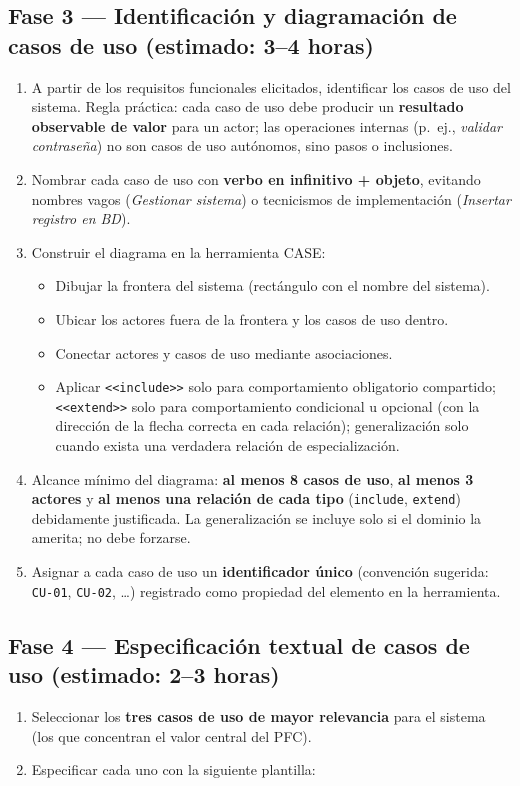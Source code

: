 \documentclass[11pt]{article}
\begin{document}
\subsection*{\textcolor{midblue}{Fase 3 --- Identificación y diagramación de casos de uso (estimado: 3--4 horas)}}
\begin{enumerate}[leftmargin=18pt,itemsep=2pt]
  \item A partir de los requisitos funcionales elicitados, identificar los casos de uso del sistema. Regla práctica: cada caso de uso debe producir un \textbf{resultado observable de valor} para un actor; las operaciones internas (p.~ej., \textit{validar contraseña}) no son casos de uso autónomos, sino pasos o inclusiones.
  \item Nombrar cada caso de uso con \textbf{verbo en infinitivo + objeto}, evitando nombres vagos (\textit{Gestionar sistema}) o tecnicismos de implementación (\textit{Insertar registro en BD}).
  \item Construir el diagrama en la herramienta CASE:
    \begin{itemize}[leftmargin=14pt,itemsep=1pt]
      \item Dibujar la frontera del sistema (rectángulo con el nombre del sistema).
      \item Ubicar los actores fuera de la frontera y los casos de uso dentro.
      \item Conectar actores y casos de uso mediante asociaciones.
      \item Aplicar \texttt{<<include>>} solo para comportamiento obligatorio compartido; \texttt{<<extend>>} solo para comportamiento condicional u opcional (con la dirección de la flecha correcta en cada relación); generalización solo cuando exista una verdadera relación de especialización.
    \end{itemize}
  \item Alcance mínimo del diagrama: \textbf{al menos 8 casos de uso}, \textbf{al menos 3 actores} y \textbf{al menos una relación de cada tipo} (\texttt{include}, \texttt{extend}) debidamente justificada. La generalización se incluye solo si el dominio la amerita; no debe forzarse.
  \item Asignar a cada caso de uso un \textbf{identificador único} (convención sugerida: \texttt{CU-01}, \texttt{CU-02}, \ldots) registrado como propiedad del elemento en la herramienta.
\end{enumerate}

\subsection*{\textcolor{midblue}{Fase 4 --- Especificación textual de casos de uso (estimado: 2--3 horas)}}
\begin{enumerate}[leftmargin=18pt,itemsep=2pt]
  \item Seleccionar los \textbf{tres casos de uso de mayor relevancia} para el sistema (los que concentran el valor central del PFC).
  \item Especificar cada uno con la siguiente plantilla:
\end{enumerate}
\end{document}
